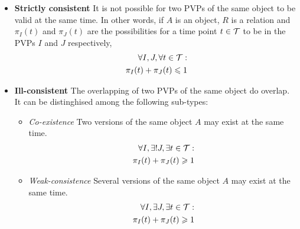 \begin{itemize}
\item 
\begin{definition}
\textbf{Strictly consistent} It is not possible for two PVPs of the same object to be valid at the same time. In other words, if $A$ is an object, $R$ is a relation and $\pi_{I}\left(t \right)$ and $\pi_{J}\left(t \right)$ are the possibilities for a time point $t \in \mathcal{T}$ to be in the PVPs $I$ and $J$ respectively,
\begin{align}
\label{eq:stricly-consistent}
\forall I,J, \forall t \in \mathcal{T} :\\
\nonumber
\pi_{I}(t) + \pi_{J}(t) \leqslant 1
\end{align}
\end{definition}




\item 
\begin{definition}
 \textbf{Ill-consistent} The overlapping of two PVPs of the same object do overlap. It can be distinghised among the following sub-types:
	\begin{itemize}
	\item 
	      \begin{definition}
	      \emph{Co-existence} Two versions of the same object $A$ may exist at the same time.
		      \begin{align}
		      \label{eq:co-existence}
		      \forall I, \exists ! J, \exists t \in \mathcal{T} : \\
		      \nonumber
		      \pi_{I}(t) + \pi_{J}(t) \geqslant 1
		      \end{align}
	      \end{definition}


	\item 
	      \begin{definition}
	      \emph{Weak-consistence} Several versions of the same object $A$ may exist at the same time.
		      \begin{align}
		      \label{eq:weak-consistence}
		      \forall I, \exists J, \exists t \in \mathcal{T} : \\
		      \nonumber
		      \pi_{I}(t) + \pi_{J}(t) \geqslant 1
		      \end{align}
	      \end{definition}

	\end{itemize}
\end{definition}


\end{itemize}

